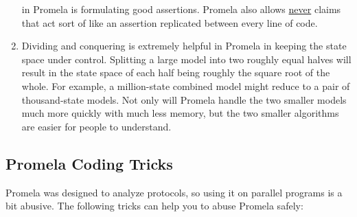 \begin{enumerate}
	in Promela is formulating good assertions.  Promela also allows
	\url{never} claims that act sort of like an assertion replicated
	between every line of code.
\item	Dividing and conquering is extremely helpful in Promela in keeping
	the state space under control.  Splitting a large model into two
	roughly equal halves will result in the state space of each
	half being roughly the square root of the whole.
	For example, a million-state combined model might reduce to a
	pair of thousand-state models.
	Not only will Promela handle the two smaller models much more
	quickly with much less memory, but the two smaller algorithms
	are easier for people to understand.
\end{enumerate}


\subsection{Promela Coding Tricks}
\label{app:formal:Promela Coding Tricks}

Promela was designed to analyze protocols, so using it on parallel programs
is a bit abusive.
The following tricks can help you to abuse Promela safely:

